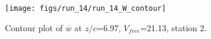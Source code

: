 \begin{figure}[H]
\centering
\texttt{[image: figs/run\_14/run\_14\_W\_contour]}
\caption{Contour plot of $\overline{w}$ at $z/c$=6.97, $V_{free}$=21.13, station 2.}
\label{fig:run_14_W_contour}
\end{figure}



